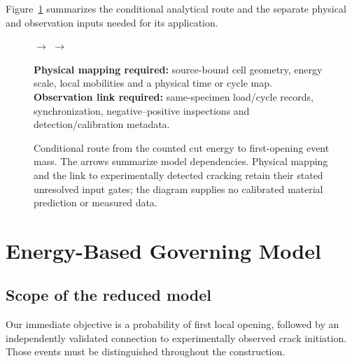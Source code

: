 \documentclass[11pt]{article}
\begin{document}
Figure~\ref{fig:conditional-route} summarizes the conditional analytical route
and the separate physical and observation inputs needed for its application.
\begin{figure}[tbp]
\centering
\setlength{\fboxsep}{5pt}
\footnotesize
{}
\hfill$\longrightarrow$\hfill
{}
\hfill$\longrightarrow$\hfill
{}
\par\medskip
\begin{minipage}{0.96\linewidth}\raggedright
\textbf{Physical mapping required:} source-bound cell geometry, energy scale,
local mobilities and a physical time or cycle map.\\[3pt]
\textbf{Observation link required:} same-specimen load/cycle records,
synchronization, negative--positive inspections and detection/calibration metadata.
\end{minipage}
\caption{Conditional route from the counted cut energy to first-opening event mass.
The arrows summarize model dependencies. Physical mapping and the link to
experimentally detected cracking retain their stated unresolved input gates;
the diagram supplies no calibrated material prediction or measured data.}
\label{fig:conditional-route}
\end{figure}

\section{Energy-Based Governing Model}
\subsection{Scope of the reduced model}
Our immediate objective is a probability of first local opening, followed by
an independently validated connection to experimentally observed crack initiation.
Those events must be distinguished throughout the construction.
\end{document}
